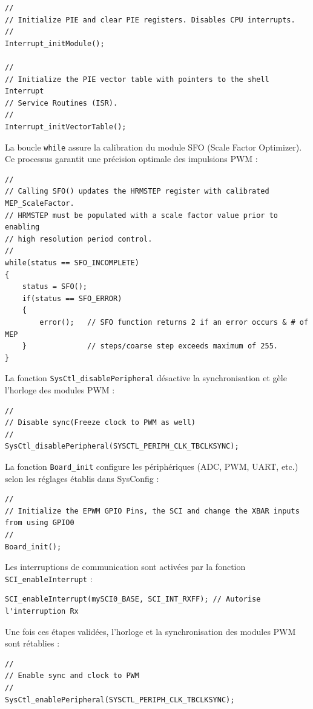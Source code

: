\begin{verbatim}
//
// Initialize PIE and clear PIE registers. Disables CPU interrupts.
//
Interrupt_initModule();

//
// Initialize the PIE vector table with pointers to the shell Interrupt
// Service Routines (ISR).
//
Interrupt_initVectorTable();
\end{verbatim}

La boucle \texttt{while} assure la calibration du module SFO (Scale Factor Optimizer). Ce processus garantit une précision optimale des impulsions PWM :

\begin{verbatim}
//
// Calling SFO() updates the HRMSTEP register with calibrated MEP_ScaleFactor.
// HRMSTEP must be populated with a scale factor value prior to enabling
// high resolution period control.
//
while(status == SFO_INCOMPLETE)
{
    status = SFO();
    if(status == SFO_ERROR)
    {
        error();   // SFO function returns 2 if an error occurs & # of MEP
    }              // steps/coarse step exceeds maximum of 255.
}
\end{verbatim}

La fonction \texttt{SysCtl\_disablePeripheral} désactive la synchronisation et gèle l'horloge des modules PWM :

\begin{verbatim}
//
// Disable sync(Freeze clock to PWM as well)
//
SysCtl_disablePeripheral(SYSCTL_PERIPH_CLK_TBCLKSYNC);
\end{verbatim}

La fonction \texttt{Board\_init} configure les périphériques (ADC, PWM, UART, etc.) selon les réglages établis dans SysConfig :

\begin{verbatim}
//
// Initialize the EPWM GPIO Pins, the SCI and change the XBAR inputs from using GPIO0
//
Board_init();

\end{verbatim}

Les interruptions de communication sont activées par la fonction \texttt{SCI\_enableInterrupt} :

\begin{verbatim}
SCI_enableInterrupt(mySCI0_BASE, SCI_INT_RXFF); // Autorise l'interruption Rx
\end{verbatim}

Une fois ces étapes validées, l'horloge et la synchronisation des modules PWM sont rétablies :

\begin{verbatim}
//
// Enable sync and clock to PWM
//
SysCtl_enablePeripheral(SYSCTL_PERIPH_CLK_TBCLKSYNC);
\end{verbatim}

